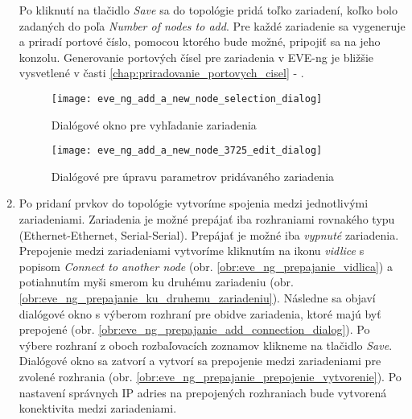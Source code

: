 \begin{enumerate}[noitemsep]
    Po kliknutí na tlačidlo \emph{Save} sa do topológie pridá toľko zariadení, koľko bolo zadaných do poľa \emph{Number of nodes to add}. Pre každé zariadenie sa vygeneruje a priradí portové číslo, pomocou ktorého bude možné, pripojiť sa na jeho konzolu. Generovanie portových čísel pre zariadenia v EVE-ng je bližšie vysvetlené v časti \ref{chap:priradovanie_portovych_cisel} - .
    
\begin{figure}
    \centering
    \texttt{[image: eve\_ng\_add\_a\_new\_node\_selection\_dialog]}
    \caption{Dialógové okno pre vyhľadanie zariadenia}
    \label{obr:eve_ng_add_a_new_node_selection_dialog}
    
    \vspace{1cm}
    
    \centering
    \texttt{[image: eve\_ng\_add\_a\_new\_node\_3725\_edit\_dialog]}
    \caption{Dialógové pre úpravu parametrov pridávaného zariadenia}
    \label{obr:eve_ng_add_a_new_node_3725_edit_dialog}
\end{figure}
    
    \item Po pridaní prvkov do topológie vytvoríme spojenia medzi jednotlivými zariadeniami. Zariadenia je možné prepájať iba rozhraniami rovnakého typu (Ethernet-Ethernet, Serial-Serial). Prepájať je možné iba \emph{vypnuté} zariadenia. Prepojenie medzi zariadeniami vytvoríme kliknutím na ikonu \emph{vidlice} s popisom \emph{Connect to another node} (obr. \ref{obr:eve_ng_prepajanie_vidlica}) a potiahnutím myši smerom ku druhému zariadeniu (obr. \ref{obr:eve_ng_prepajanie_ku_druhemu_zariadeniu}). Následne sa objaví dialógové okno s výberom rozhraní pre obidve zariadenia, ktoré majú byť prepojené (obr. \ref{obr:eve_ng_prepajanie_add_connection_dialog}). Po výbere rozhraní z oboch rozbaľovacích zoznamov klikneme na tlačidlo \emph{Save}. Dialógové okno sa zatvorí a vytvorí sa prepojenie medzi zariadeniami pre zvolené rozhrania (obr. \ref{obr:eve_ng_prepajanie_prepojenie_vytvorenie}). Po nastavení správnych IP adries na prepojených rozhraniach bude vytvorená konektivita medzi zariadeniami.
    
    \begin{comment}
    \begin{figure}
        \centering
        \texttt{[image: eve\_ng\_prepajanie\_vidlica]}
        \caption{Ikona na prepájanie zariadení}
        \label{obr:eve_ng_prepajanie_vidlica}
        

\end{comment}
\end{enumerate}
